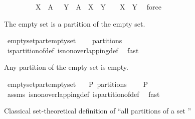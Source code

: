 \begin{isabellebody}
\ \ \isacommand{{\isacharbraceright}}\isamarkupfalse%
\isanewline
\ \ \isamarkupfalse%
\ \isamarkupfalse%
\ {\isachardoublequoteopen}{\isasymforall}\ X\ {\isasymin}\ {\isacharbraceleft}A{\isacharbraceright}\ {\isachardot}\ {\isasymforall}\ Y\ {\isasymin}\ {\isacharbraceleft}A{\isacharbraceright}\ {\isachardot}\ X\ {\isasyminter}\ Y\ {\isasymnoteq}\ {\isacharbraceleft}{\isacharbraceright}\ {\isasymlongleftrightarrow}\ X\ {\isacharequal}\ Y{\isachardoublequoteclose}\ \isamarkupfalse%
\ force\isanewline
{}\isamarkupfalse%
%
\endisatagproof
{\isafoldproof}%
%
\isadelimproof
%
\endisadelimproof
%
\begin{isamarkuptext}%
The empty set is a partition of the empty set.%
\end{isamarkuptext}%
\isamarkuptrue%
\isamarkupfalse%
\ emptyset{\isacharunderscore}part{\isacharunderscore}emptyset{}{\isacharcolon}\isanewline
\ \ \ {\isachardoublequoteopen}{\isacharbraceleft}{\isacharbraceright}\ partitions\ {\isacharbraceleft}{\isacharbraceright}{\isachardoublequoteclose}\ \isanewline
%
\isadelimproof
\ \ %
\endisadelimproof
%
\isatagproof
{}\isamarkupfalse%
\ is{\isacharunderscore}partition{\isacharunderscore}of{\isacharunderscore}def\ is{\isacharunderscore}non{\isacharunderscore}overlapping{\isacharunderscore}def\ \isamarkupfalse%
\ fast%
\endisatagproof
{\isafoldproof}%
%
\isadelimproof
%
\endisadelimproof
%
\begin{isamarkuptext}%
Any partition of the empty set is empty.%
\end{isamarkuptext}%
\isamarkuptrue%
\isamarkupfalse%
\ emptyset{\isacharunderscore}part{\isacharunderscore}emptyset{}{\isacharcolon}\isanewline
\ \ \ {\isachardoublequoteopen}P\ partitions\ {\isacharbraceleft}{\isacharbraceright}{\isachardoublequoteclose}\isanewline
\ \ \ {\isachardoublequoteopen}P\ {\isacharequal}\ {\isacharbraceleft}{\isacharbraceright}{\isachardoublequoteclose}\isanewline
%
\isadelimproof
\ \ %
\endisadelimproof
%
\isatagproof
{}\isamarkupfalse%
\ assms\ is{\isacharunderscore}non{\isacharunderscore}overlapping{\isacharunderscore}def\ is{\isacharunderscore}partition{\isacharunderscore}of{\isacharunderscore}def\ \isamarkupfalse%
\ fast%
\endisatagproof
{\isafoldproof}%
%
\isadelimproof
%
\endisadelimproof
%
\begin{isamarkuptext}%
Classical set-theoretical definition of ``all partitions of a set ''%

\end{isamarkuptext}
\end{isabellebody}
